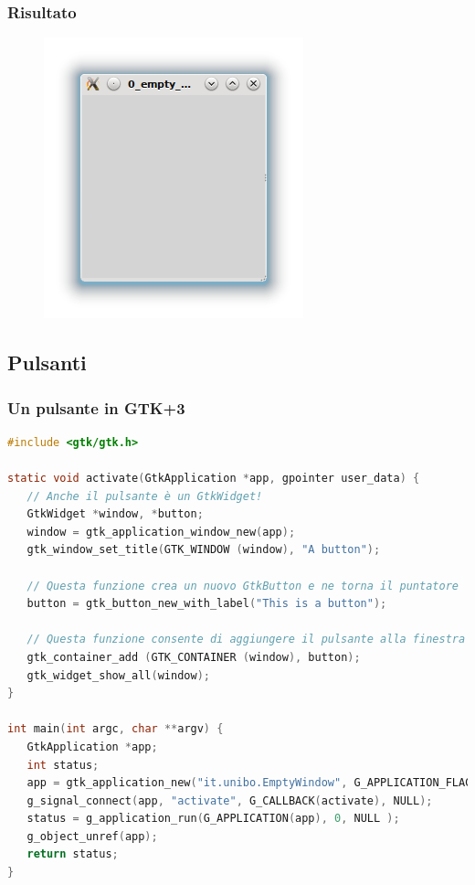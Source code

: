 \documentclass{beamer}
\begin{document}
\begin{frame}
\frametitle{Risultato}
\begin{figure}
 \includegraphics[width=0.6\columnwidth]{img/0}
\end{figure}
\end{frame}

\subsection{Pulsanti}

\begin{frame}[fragile]
\frametitle{Un pulsante in GTK+3}
\begin{lstlisting}[language=C]
#include <gtk/gtk.h>

static void activate(GtkApplication *app, gpointer user_data) {
   // Anche il pulsante è un GtkWidget!
   GtkWidget *window, *button;
   window = gtk_application_window_new(app);
   gtk_window_set_title(GTK_WINDOW (window), "A button");

   // Questa funzione crea un nuovo GtkButton e ne torna il puntatore
   button = gtk_button_new_with_label("This is a button");
   
   // Questa funzione consente di aggiungere il pulsante alla finestra
   gtk_container_add (GTK_CONTAINER (window), button);
   gtk_widget_show_all(window);
}

int main(int argc, char **argv) {
   GtkApplication *app;
   int status;
   app = gtk_application_new("it.unibo.EmptyWindow", G_APPLICATION_FLAGS_NONE);
   g_signal_connect(app, "activate", G_CALLBACK(activate), NULL);
   status = g_application_run(G_APPLICATION(app), 0, NULL );
   g_object_unref(app);
   return status;
}
\end{lstlisting} 

\end{frame}
\end{document}
